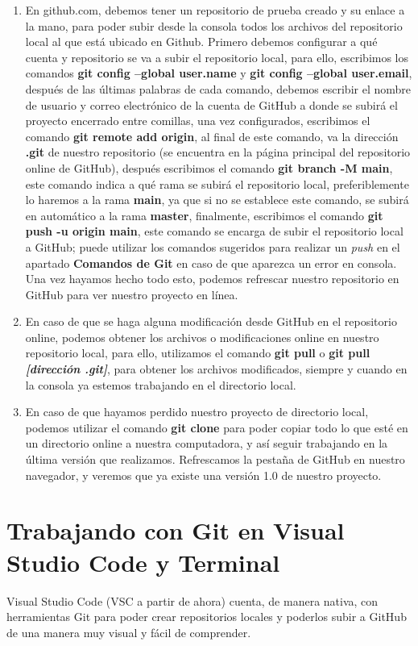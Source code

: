 \begin{enumerate}
    \item En github.com, debemos tener un repositorio de prueba creado y su enlace a la mano, para poder subir desde la consola todos los archivos del repositorio local al que está ubicado en Github. Primero debemos configurar a qué cuenta y repositorio se va a subir el repositorio local, para ello, escribimos los comandos \textbf{git config –global user.name} y \textbf{git config –global user.email}, después de las últimas palabras de cada comando, debemos escribir el nombre de usuario y correo electrónico de la cuenta de GitHub a donde se subirá el proyecto encerrado entre comillas, una vez configurados, escribimos el comando \textbf{git remote add origin}, al final de este comando, va la dirección \textbf{.git} de nuestro repositorio (se encuentra en la página principal del repositorio online de GitHub), después escribimos el comando \textbf{git branch -M main}, este comando indica a qué rama se subirá el repositorio local, preferiblemente lo haremos a la rama \textbf{main}, ya que si no se establece este comando, se subirá en automático a la rama \textbf{master}, finalmente, escribimos el comando \textbf{git push -u origin main}, este comando se encarga de subir el repositorio local a GitHub; puede utilizar los comandos sugeridos para realizar un \textit{push} en el apartado \textbf{Comandos de Git} en caso de que aparezca un error en consola. Una vez hayamos hecho todo esto, podemos refrescar nuestro repositorio en GitHub para ver nuestro proyecto en línea.
    \item En caso de que se haga alguna modificación desde GitHub en el repositorio online, podemos obtener los archivos o modificaciones online en nuestro repositorio local, para ello, utilizamos el comando \textbf{git pull} o \textbf{git pull \textit{[dirección .git]}}, para obtener los archivos modificados, siempre y cuando en la consola ya estemos trabajando en el directorio local.
    \item En caso de que hayamos perdido nuestro proyecto de directorio local, podemos utilizar el comando \textbf{git clone} para poder copiar todo lo que esté en un directorio online a nuestra computadora, y así seguir trabajando en la última versión que realizamos. Refrescamos la pestaña de GitHub en nuestro navegador, y veremos que ya existe una versión 1.0 de nuestro proyecto.
\end{enumerate}



\section{Trabajando con Git en Visual Studio Code y Terminal}
\hspace{0.55cm}Visual Studio Code (VSC a partir de ahora) cuenta, de manera nativa, con herramientas Git para poder crear repositorios locales y poderlos subir a GitHub de una manera muy visual y fácil de comprender.

